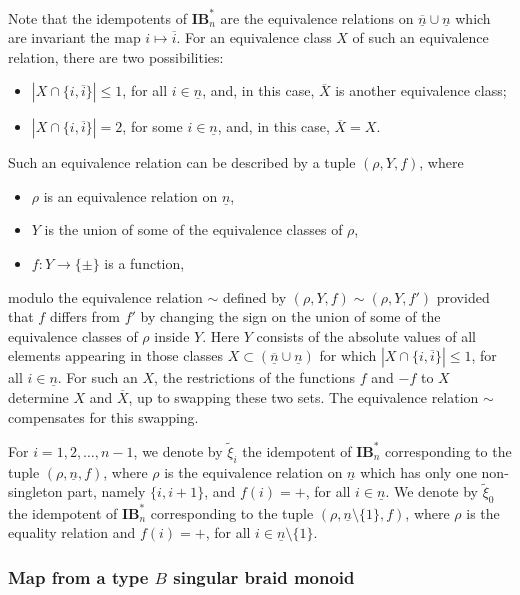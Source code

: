 \documentclass[a4paper]{amsart}
\begin{document}
Note that the idempotents of $\mathbf{IB}^*_n$ are the
equivalence relations on $\underline{\overline{n}}\cup\underline{n}$
which are invariant the map $i\mapsto \overline{i}$. For an equivalence class
$X$ of such an equivalence relation,  there are two possibilities:
\begin{itemize}
\item $|X\cap\{i,\overline{i}\}|\leq 1$, for all $i\in\underline{n}$,
and, in this case, $\overline{X}$ is another equivalence class;
\item $|X\cap\{i,\overline{i}\}|=2$, for some $i\in\underline{n}$,
and, in this case, $\overline{X}=X$.
\end{itemize}
Such an equivalence relation can be described by a tuple
$(\rho,Y,f)$, where
\begin{itemize}
\item $\rho$ is an equivalence relation on $\underline{n}$,
\item $Y$ is the union of some of the equivalence classes of $\rho$,
\item $f:Y\to\{\pm\}$ is a function,
\end{itemize}
modulo the equivalence relation $\sim$ defined by 
$(\rho,Y,f)\sim(\rho,Y,f')$ provided that $f$ differs from $f'$
by changing the sign on the union of some of the equivalence classes 
of $\rho$ inside $Y$. Here $Y$ consists of the absolute values of
all elements appearing in those classes 
$X\subset (\underline{\overline{n}}\cup\underline{n})$
for which $|X\cap\{i,\overline{i}\}|\leq 1$, for all $i\in\underline{n}$.
For such an $X$, the restrictions of the functions 
$f$ and $-f$ to $X$ determine $X$ and $\overline{X}$, up 
to swapping these two sets. The equivalence
relation $\sim$ compensates for this swapping.

For $i=1,2,\dots,n-1$, we denote by $\tilde{\xi}_{i}$ the idempotent of 
$\mathbf{IB}^*_n$ corresponding to the tuple $(\rho,\underline{n},f)$, where
$\rho$ is the equivalence relation on
$\underline{n}$ which has only one non-singleton part, namely $\{i,i+1\}$,
and $f(i)=+$, for all $i\in \underline{n}$. We denote by $\tilde{\xi}_{0}$ 
the idempotent of $\mathbf{IB}^*_n$ corresponding to the 
tuple $(\rho,\underline{n}\setminus\{1\},f)$, where
$\rho$ is the equality relation and $f(i)=+$, for all 
$i\in \underline{n}\setminus\{1\}$.

\subsubsection{Map from a type $B$ singular braid monoid}\label{s4.3.5}
\end{document}
